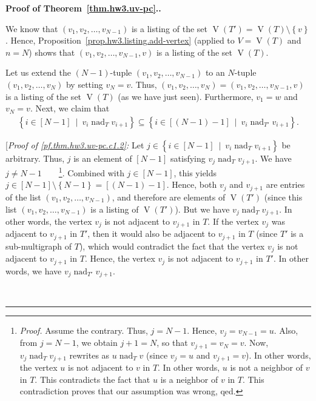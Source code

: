 \documentclass[numbers=enddot,12pt,final,onecolumn,notitlepage]{scrartcl}%
\theoremstyle{definition}
\newenvironment{proof}[1][Proof]{\noindent\textbf{#1.} }{\ \rule{0.5em}{0.5em}}
\newcommand{\set}[1]{\left\{ #1 \right\}}
\newcommand{\tup}[1]{\left( #1 \right)}
\newcommand{\ive}[1]{\left[ #1 \right]}
\newcommand{\verts}[1]{\operatorname{V}\left( #1 \right)}
\begin{document}
\begin{proof}[Proof of Theorem~\ref{thm.hw3.uv-pc}.]
\begin{itemize}
        We know that $\tup{v_1, v_2, \ldots, v_{N-1}}$ is a listing
        of the set $\verts{T'} = \verts{T} \setminus \set{v}$.
        Hence, Proposition~\ref{prop.hw3.listing.add-vertex}
        (applied to $V = \verts{T}$ and $n = N$) shows that
        $\tup{v_1, v_2, \ldots, v_{N-1}, v}$ is a listing of the
        set $\verts{T}$.
        
        Let us extend the $\tup{N-1}$-tuple
        $\tup{v_1, v_2, \ldots, v_{N-1}}$ to an $N$-tuple
        $\tup{v_1, v_2, \ldots, v_N}$ by setting $v_N = v$.
        Thus,
        $\tup{v_1, v_2, \ldots, v_N}
        = \tup{v_1, v_2, \ldots, v_{N-1}, v}$ is a listing of the
        set $\verts{T}$ (as we have just seen).
        Furthermore, $v_1 = w$ and $v_N = v$.
        Next, we claim that
        \begin{align}
        \set{i \in \ive{N-1} \ \mid \ v_i \operatorname{nad}_T v_{i+1} }
        \subseteq
        \set{i \in \ive{\tup{N-1}-1} \ \mid \ v_i \operatorname{nad}_{T'} v_{i+1} } .
        \label{pf.thm.hw3.uv-pc.c1.2}
        \end{align}
        
        [\textit{Proof of \eqref{pf.thm.hw3.uv-pc.c1.2}:}
        Let
        $j \in \set{i \in \ive{N-1} \ \mid \ v_i \operatorname{nad}_T v_{i+1} }$
        be arbitrary.
        Thus, $j$ is an element of $\ive{N-1}$ satisfying
        $v_j \operatorname{nad}_T v_{j+1}$.
        We have $j \neq N-1$\ \ \ \ \footnote{\textit{Proof.}
          Assume the contrary.
          Thus, $j = N-1$.
          Hence, $v_j = v_{N-1} = u$.
          Also, from $j = N-1$, we obtain $j+1 = N$, so that
          $v_{j+1} = v_N = v$.
          Now, $v_j \operatorname{nad}_T v_{j+1}$ rewrites as
          $u \operatorname{nad}_T v$ (since $v_j = u$ and
          $v_{j+1} = v$).
          In other words, the vertex $u$ is not adjacent to $v$ in
          $T$.
          In other words, $u$ is not a neighbor of $v$ in $T$.
          This contradicts the fact that $u$ is a neighbor of $v$ in
          $T$.
          This contradiction proves that our assumption was wrong,
          qed.}.
        Combined with $j \in \ive{N-1}$, this yields
        $j \in \ive{N-1} \setminus \set{N-1} = \ive{\tup{N-1}-1}$.
        Hence, both $v_j$ and $v_{j+1}$ are entries of the list
        $\tup{v_1, v_2, \ldots, v_{N-1}}$, and therefore are elements
        of $\verts{T'}$ (since this list
        $\tup{v_1, v_2, \ldots, v_{N-1}}$ is a listing of
        $\verts{T'}$).
        But we have $v_j \operatorname{nad}_T v_{j+1}$.
        In other words, the vertex $v_j$ is not adjacent to $v_{j+1}$
        in $T$.
        If the vertex $v_j$ was adjacent to $v_{j+1}$ in $T'$, then
        it would also be adjacent to $v_{j+1}$ in $T$ (since $T'$ is
        a sub-multigraph of $T$), which would contradict the fact that
        the vertex $v_j$ is not adjacent to $v_{j+1}$ in $T$.
        Hence, the vertex $v_j$ is not adjacent to $v_{j+1}$ in $T'$.
        In other words, we have
        $v_j \operatorname{nad}_{T'} v_{j+1}$.
        

\end{itemize}
\end{proof}
\end{document}
